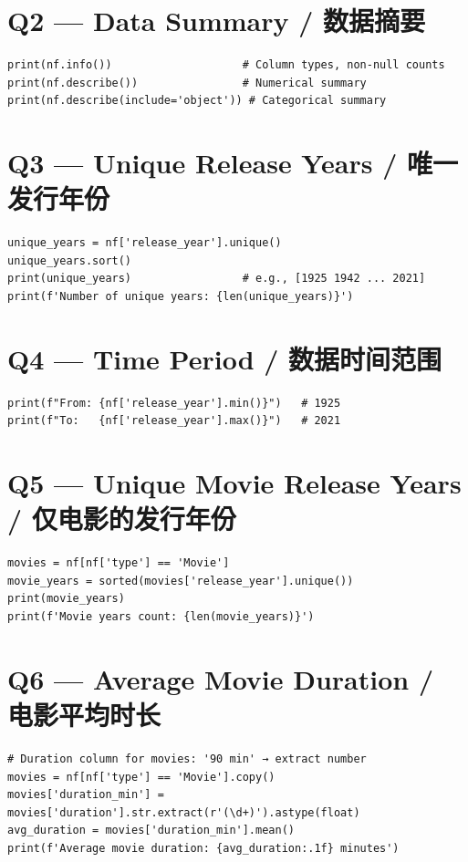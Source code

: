 \documentclass[11pt,a4paper]{report}
\begin{document}
\section*{Q2 — Data Summary / 数据摘要}
\begin{lstlisting}
print(nf.info())                    # Column types, non-null counts
print(nf.describe())                # Numerical summary
print(nf.describe(include='object')) # Categorical summary
\end{lstlisting}

\section*{Q3 — Unique Release Years / 唯一发行年份}
\begin{lstlisting}
unique_years = nf['release_year'].unique()
unique_years.sort()
print(unique_years)                 # e.g., [1925 1942 ... 2021]
print(f'Number of unique years: {len(unique_years)}')
\end{lstlisting}

\section*{Q4 — Time Period / 数据时间范围}
\begin{lstlisting}
print(f"From: {nf['release_year'].min()}")   # 1925
print(f"To:   {nf['release_year'].max()}")   # 2021
\end{lstlisting}

\section*{Q5 — Unique Movie Release Years / 仅电影的发行年份}
\begin{lstlisting}
movies = nf[nf['type'] == 'Movie']
movie_years = sorted(movies['release_year'].unique())
print(movie_years)
print(f'Movie years count: {len(movie_years)}')
\end{lstlisting}

\section*{Q6 — Average Movie Duration / 电影平均时长}
\begin{lstlisting}
# Duration column for movies: '90 min' → extract number
movies = nf[nf['type'] == 'Movie'].copy()
movies['duration_min'] = movies['duration'].str.extract(r'(\d+)').astype(float)
avg_duration = movies['duration_min'].mean()
print(f'Average movie duration: {avg_duration:.1f} minutes')
\end{lstlisting}
\end{document}
